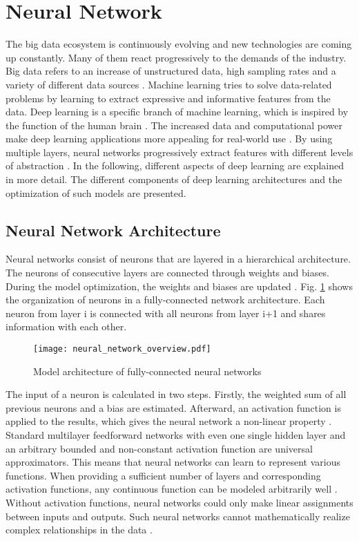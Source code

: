 \section{Neural Network}
The big data ecosystem is continuously evolving and new technologies are coming up constantly. Many of them react progressively to the demands of the industry. Big data refers to an increase of unstructured data, high sampling rates and a variety of different data sources \cite{Sagiroglu2013}. Machine learning tries to solve data-related problems by learning to extract expressive and informative features from the data. Deep learning is a specific branch of machine learning, which is inspired by the function of the human brain \cite{Calin2020}. The increased data and computational power make deep learning applications more appealing for real-world use \cite{ZHAO2019213}. By using multiple layers, neural networks progressively extract features with different levels of abstraction \cite{ZHAO2019213}. In the following, different aspects of deep learning are explained in more detail. The different components of deep learning architectures and the optimization of such models are presented. 

\subsection{Neural Network Architecture}
Neural networks consist of neurons that are layered in a hierarchical architecture. The neurons of consecutive layers are connected through weights and biases. During the model optimization, the weights and biases are updated \cite{ShilohPerl2020}. Fig. \ref{fig:neural_network_overview} shows the organization of neurons in a fully-connected network architecture. Each neuron from layer i is connected with all neurons from layer i+1 and shares information with each other.

\begin{figure}[H]
  \centering
  \texttt{[image: neural\_network\_overview.pdf]}
  \caption {Model architecture of fully-connected neural networks}
  \label{fig:neural_network_overview}
\end{figure}
The input of a neuron is calculated in two steps. Firstly, the weighted sum of all previous neurons and a bias are estimated. Afterward, an activation function is applied to the results, which gives the neural network a non-linear property \cite{ShilohPerl2020}. Standard multilayer feedforward networks with even one single hidden layer and an arbitrary bounded and non-constant activation function are universal approximators. This means that neural networks can learn to represent various functions. When providing a sufficient number of layers and corresponding activation functions, any continuous function can be modeled arbitrarily well \cite{HORNIK1991}. Without activation functions, neural networks could only make linear assignments between inputs and outputs. Such neural networks cannot mathematically realize complex relationships in the data \cite{Ding2018}.

